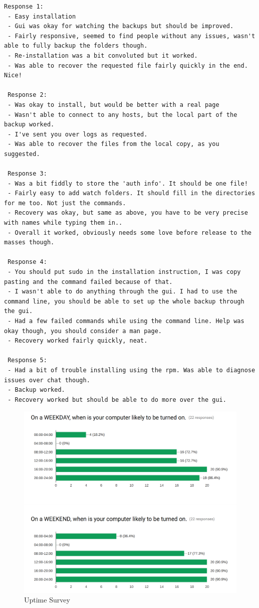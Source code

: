 \documentclass[11pt, a4paper, twocolumn, twoside]{report}
\begin{document}
\begin{lstlisting}[language=RsT, caption=Membrane Hallway Test Feedback, label=lst:mbrntestresult]
 Response 1:
 - Easy installation
 - Gui was okay for watching the backups but should be improved.
 - Fairly responsive, seemed to find people without any issues, wasn't able to fully backup the folders though.
 - Re-installation was a bit convoluted but it worked.
 - Was able to recover the requested file fairly quickly in the end. Nice!
  
 Response 2:
 - Was okay to install, but would be better with a real page
 - Wasn't able to connect to any hosts, but the local part of the backup worked.
 - I've sent you over logs as requested.
 - Was able to recover the files from the local copy, as you suggested.
 
 Response 3:
 - Was a bit fiddly to store the 'auth info'. It should be one file!
 - Fairly easy to add watch folders. It should fill in the directories for me too. Not just the commands.
 - Recovery was okay, but same as above, you have to be very precise with names while typing them in..
 - Overall it worked, obviously needs some love before release to the masses though.
  
 Response 4:
 - You should put sudo in the installation instruction, I was copy pasting and the command failed because of that.
 - I wasn't able to do anything through the gui. I had to use the command line, you should be able to set up the whole backup through the gui.
 - Had a few failed commands while using the command line. Help was okay though, you should consider a man page.
 - Recovery worked fairly quickly, neat.
 
 Response 5:
 - Had a bit of trouble installing using the rpm. Was able to diagnose issues over chat though.
 - Backup worked.
 - Recovery worked but should be able to do more over the gui.
\end{lstlisting}


\begin{figure}[ht!]
 \centering
 \includegraphics[width=\textwidth]{uptime-survey}
 \caption{Uptime Survey}
 \label{fig:uptime-survey}
\end{figure}
\end{document}
